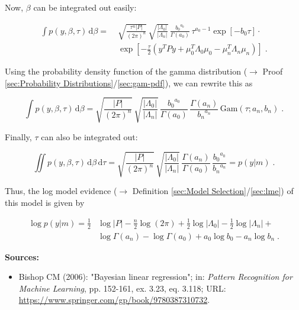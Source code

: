 \documentclass[a4paper,12pt,twoside]{book}
\begin{document}
Now, $\beta$ can be integrated out easily:

\begin{equation} \label{eq:blr-lme-GLM-NG-LME-s3}
\begin{split}
\int p(y,\beta,\tau) \, \mathrm{d}\beta = \; & \sqrt{\frac{\tau^n |P|}{(2 \pi)^n}} \, \sqrt{\frac{|\Lambda_0|}{|\Lambda_n|}} \, \frac{ {b_0}^{a_0}}{\Gamma(a_0)} \, \tau^{a_0-1} \exp[-b_0 \tau] \cdot \\
& \exp\left[ -\frac{\tau}{2} (y^T P y + \mu_0^T \Lambda_0 \mu_0 - \mu_n^T \Lambda_n \mu_n) \right] \; .
\end{split}
\end{equation}

Using the probability density function of the gamma distribution ($\rightarrow$ Proof \ref{sec:Probability Distributions}/\ref{sec:gam-pdf}), we can rewrite this as

\begin{equation}\label{eq:blr-lme-GLM-NG-LME-s4}
\int p(y,\beta,\tau) \, \mathrm{d}\beta = \sqrt{\frac{|P|}{(2 \pi)^n}} \, \sqrt{\frac{|\Lambda_0|}{|\Lambda_n|}} \, \frac{ {b_0}^{a_0}}{\Gamma(a_0)} \, \frac{\Gamma(a_n)}{ {b_n}^{a_n}} \, \mathrm{Gam}(\tau; a_n, b_n) \; .
\end{equation}

Finally, $\tau$ can also be integrated out:

\begin{equation} \label{eq:blr-lme-GLM-NG-LME-s5}
\iint p(y,\beta,\tau) \, \mathrm{d}\beta \, \mathrm{d}\tau = \sqrt{\frac{|P|}{(2 \pi)^n}} \, \sqrt{\frac{|\Lambda_0|}{|\Lambda_n|}} \, \frac{\Gamma(a_n)}{\Gamma(a_0)} \, \frac{ {b_0}^{a_0}}{ {b_n}^{a_n}} = p(y|m) \; .
\end{equation}

Thus, the log model evidence ($\rightarrow$ Definition \ref{sec:Model Selection}/\ref{sec:lme}) of this model is given by

\begin{equation} \label{eq:blr-lme-GLM-NG-LME-s6}
\begin{split}
\log p(y|m) = \frac{1}{2} & \log |P| - \frac{n}{2} \log (2 \pi)  + \frac{1}{2} \log |\Lambda_0| - \frac{1}{2} \log |\Lambda_n| + \\
& \log \Gamma(a_n) - \log \Gamma(a_0) + a_0 \log b_0 - a_n \log b_n \; .
\end{split}
\end{equation}


\vspace{1em}
\textbf{Sources:}
\begin{itemize}
\item Bishop CM (2006): "Bayesian linear regression"; in: \textit{Pattern Recognition for Machine Learning}, pp. 152-161, ex. 3.23, eq. 3.118; URL: \url{https://www.springer.com/gp/book/9780387310732}.
\end{itemize}
\end{document}
